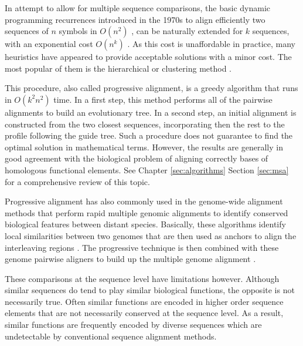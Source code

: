 In attempt to allow for multiple sequence comparisons, the basic dynamic
programming recurrences introduced in the 1970s to align efficiently two
sequences of $n$ symbols in $O(n^2)$ \citep{needleman:1970a,sellers:1974a},
can be naturally extended for $k$ sequences, with an exponential cost
$O(n^k)$ \citep{waterman:1976a}. As this cost is unaffordable in practice,
many heuristics have appeared to provide acceptable solutions with a minor cost.
The most popular of them is the hierarchical or clustering method
\citep{feng:1987a,thompson:1994a}. 

This procedure, also called progressive alignment, is a greedy algorithm
that runs in $O(k^2 n^2)$ time. In a first step, this method performs all
of the pairwise alignments to build an evolutionary tree. In a second step,
an initial alignment is constructed from the two closest sequences,
incorporating then the rest to the profile following the guide tree. Such a
procedure does not guarantee to find the optimal solution in mathematical
terms. However, the results are generally in good agreement with the
biological problem of aligning correctly bases of homologous functional
elements. See Chapter \ref{sec:algorithms} Section \ref{sec:msa} for a 
comprehensive review of this topic.

Progressive alignment has also commonly used in the genome-wide
alignment methods that perform rapid multiple genomic alignments to identify
conserved biological features between distant species. Basically, these
algorithms identify local similarities between two genomes that are then
used as anchors to align the interleaving regions \citep{delcher:1999a}.
The progressive technique is then combined with these genome pairwise
aligners to build up the multiple genome alignment \citep{brudno:2003a,bray:2004a}.

These comparisons at the sequence level have limitations however. Although
similar sequences do tend to play similar biological functions, the opposite
is not necessarily true. Often similar functions are encoded in higher order
sequence elements that are not necessarily conserved at the sequence level.
As a result, similar functions are frequently encoded by diverse sequences
which are undetectable by conventional sequence alignment methods.

